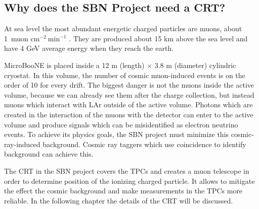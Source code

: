 \documentclass[a4paper]{article}\linespread{1.4}
\begin{document}
\subsection{Why does the SBN Project need a CRT?}
At sea level the most abundant energetic charged particles are muons, about 1~muon $\mathrm{cm}^{-2}~\mathrm{min}^{-1}$ \cite{muos}. They are produced about 15 km above the sea level and have 4 GeV average energy when they reach the earth.

MicroBooNE is placed inside a 12 m (length) $\times$ 3.8 m (diameter) cylindric cryostat. In this volume, the number of cosmic muon-induced events is on the order of 10 for every drift. The biggest danger is not the muons inside the active volume, because we can already see them after the charge collection, but instead muons which interact with LAr outside of the active volume. 
Photons which are created in the interaction of the muons with the detector can enter to the active volume and produce signals which can be misidentified as electron neutrino events.
To achieve its physics goals, the SBN project must minimize this cosmic-ray-induced background.
Cosmic ray taggers which use coincidence to identify background can achieve this.

The CRT in the SBN project covers the TPCs and creates a muon telescope in order to determine position of the ionizing charged particle. It allows to mitigate the effect the cosmic background and make measurements in the TPCs more reliable.
In the following chapter the details of the CRT will be discussed.

\end{document}
